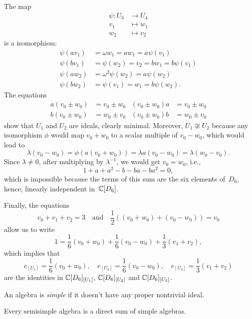 \begin{xmpls}
\begin{enumerate}[\rm a)]
    The map
    \begin{align*}
        \psi\colon U_3&\to U_4\\
        v_1&\mapsto w_1\\
        w_2&\mapsto v_2
    \end{align*}
    is a isomorphism:
    \begin{align*}
        \psi(av_1)&=\omega w_1=aw_1=a\psi(v_1)\\
        \psi(bv_1)&=\psi(w_2)=v_2=bw_1=b\psi(v_1)\\
        \psi(aw_2)&=\omega^2\psi(w_2)=a\psi(w_2)\\
        \psi(bw_2)&=\psi(v_1)=w_1=b\psi(w_2).
    \end{align*}
    The equations
    \begin{align*}
        a(v_0\pm w_0) &=v_0\pm w_0     &(v_0\pm w_0)a &= v_0\pm w_0\\
        b(v_0\pm w_0) &= w_0 \pm v_0     &(v_0\pm w_0)b &= w_0\pm v_0
    \end{align*}
    show that $U_1$ and $U_2$ are ideals, clearly minimal. Moreover, $U_1\not\cong U_2$ because any isomorphism $\phi$ would map $v_0+w_0$ to a scalar multiple of $v_0-w_0$, which would lead to
    $$
        \lambda(v_0-w_0) = \phi(a(v_0+w_0))
            = \lambda a(v_0-w_0) = \lambda(w_0-v_0).
    $$
    Since $\lambda\ne0$, after multiplying by $\lambda^{-1}$, we would get $v_0=w_0$, i.e.,
    $$
        1+a+a^2 - b - ba - ba^2 = 0,
    $$
    which is impossible because the terms of this sum are the six elements of~$D_6$, hence, linearly independent in~$\mathbb{C}[D_6]$.

    Finally, the equations
    $$
        v_0+v_1+v_2 = 3\quad\text{and}\quad
        \frac12((v_0+w_0)+(v_0-w_0)) = v_0
    $$
    allow us to write
    $$
        1 = \frac16(v_0+w_0) + \frac16(v_0-w_0) + \frac13(v_1+v_2),
    $$
    which implies that
    $$
        e_{[U_1]} = \frac16(v_0+w_0),\quad
        e_{[U_2]} = \frac16(v_0-w_0),\quad
        e_{[U_3]} = \frac13(v_1+v_2)
    $$
    are the identities in $\mathbb{C}[D_6]_{[U_1]}$, $\mathbb{C}[D_6]_{[U_2]}$ and $\mathbb{C}[D_6]_{[U_3]}$.
\end{enumerate}    
\end{xmpls}

\begin{defn}
    An algebra is \textsl{simple} if it doesn't have any proper nontrivial ideal.
\end{defn}

\begin{prop}
    Every semisimple algebra is a direct sum of simple algebras.
\end{prop}

